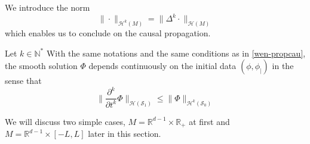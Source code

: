 We introduce the norm
\begin{equation*}
\| \cdot \|_{\mathcal{H}^k(M)} = \| \Delta^k \cdot \|_{\mathcal{H}(M)}
\end{equation*}
which enables us to conclude on the causal propagation.
\begin{proposition}
Let $k \in \mathbb{N}^*$
With the same notations and the same conditions as in \cref{wen-propcau}, 
the smooth solution $\Phi$ depends continuously on the initial data $(\phi, \phi_|)$ in the sense that
\begin{equation*}
\big\| \frac{\partial^k}{\partial t^k} \Phi\big\|_{\mathcal{H}(\mathcal{S}_1)}
\leq
\big\| \Phi\big\|_{\mathcal{H}^{k}(\mathcal{S}_0)}
\end{equation*}
\end{proposition}
We will discuss two simple cases, $M = \mathbb{R}^{d-1} \times \mathbb{R}_+$ at first and $M = \mathbb{R}^{d-1} \times [-L, L]$ later in this section. 







